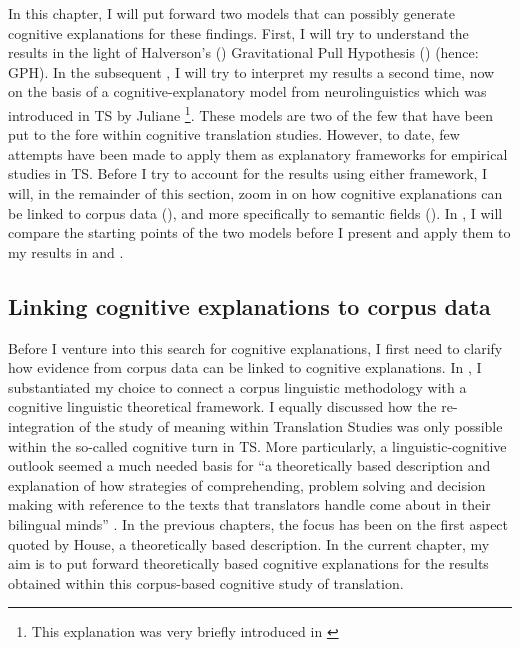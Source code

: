 In this chapter, I will put forward two models that can possibly generate cognitive explanations for these findings. First, I will try to understand the results in the light of Halverson’s (\citeyear{halverson_cognitive_2003, shreve_cognitive_2010, rojo_implications_2013, de_sutter_developing_2017}) Gravitational Pull Hypothesis () (hence: GPH). In the subsequent , I will try to interpret my results a second time, now on the basis of a cognitive-explanatory model from neurolinguistics \citep{paradis_neurolinguistic_2004, kecskes_neurofunctional_2007} which was introduced in TS by Juliane \citet{house_towards_2013}\footnote{This explanation was very briefly introduced in \citet{vandevoorde_corpus-based_2017}}. These models are two of the few that have been put to the fore within cognitive translation studies. However, to date, few attempts have been made to apply them as explanatory frameworks for empirical studies in TS. Before I try to account for the results using either framework, I will, in the remainder of this section, zoom in on how cognitive explanations can be linked to corpus data (), and more specifically to semantic fields (). In , I will compare the starting points of the two models before I present and apply them to my results in  and . 

\subsection{Linking cognitive explanations to corpus data}
\label{sec:5.1.1}  
Before I venture into this search for cognitive explanations, I first need to clarify how evidence from corpus data can be linked to cognitive explanations. In , I substantiated my choice to connect a corpus linguistic methodology with a cognitive linguistic theoretical framework. I equally discussed how the re-integration of the study of meaning within Translation Studies was only possible within the so-called cognitive turn in TS. More particularly, a linguistic-cognitive outlook seemed a much needed basis for “a theoretically based description and explanation of how strategies of comprehending, problem solving and decision making with reference to the texts that translators handle come about in their bilingual minds” \citep[48]{house_towards_2013}. In the previous chapters, the focus has been on the first aspect quoted by House, a theoretically based description. In the current chapter, my aim is to put forward theoretically based cognitive explanations for the results obtained within this corpus-based cognitive study of translation.

